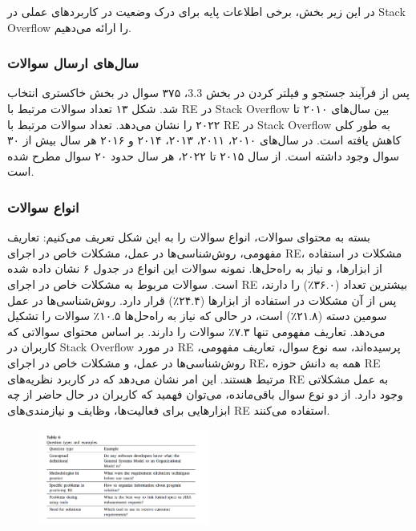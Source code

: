 \documentclass[a4paper,10pt]{article}
\begin{document}
            در این زیر بخش، برخی اطلاعات پایه برای درک وضعیت در کاربردهای عملی در Stack Overflow را ارائه می‌دهیم.

            \subsubsection{سال‌های ارسال سوالات}

                پس از فرآیند جستجو و فیلتر کردن در بخش 3.3، ۳۷۵ سوال در بخش خاکستری انتخاب شد. شکل ۱۳ تعداد سوالات مرتبط با RE در Stack Overflow بین سال‌های ۲۰۱۰ تا ۲۰۲۲ را نشان می‌دهد. تعداد سوالات مرتبط با RE در Stack Overflow به طور کلی کاهش یافته است. در سال‌های ۲۰۱۰، ۲۰۱۱، ۲۰۱۳، ۲۰۱۴ و ۲۰۱۶ هر سال بیش از ۳۰ سوال وجود داشته است. از سال ۲۰۱۵ تا ۲۰۲۲، هر سال حدود ۲۰ سوال مطرح شده است.

            \subsubsection{انواع سوالات}

                بسته به محتوای سوالات، انواع سوالات را به این شکل تعریف می‌کنیم: تعاریف مفهومی، روش‌شناسی‌ها در عمل، مشکلات خاص در اجرای RE، مشکلات در استفاده از ابزارها، و نیاز به راه‌حل‌ها. نمونه سوالات این انواع در جدول ۶ نشان داده شده است. سوالات مربوط به مشکلات خاص در اجرای RE بیشترین تعداد (۳۶.۰٪) را دارند، پس از آن مشکلات در استفاده از ابزارها (۲۴.۴٪) قرار دارد. روش‌شناسی‌ها در عمل سومین دسته (۲۱.۸٪) است، در حالی که نیاز به راه‌حل‌ها ۱۰.۵٪ سوالات را تشکیل می‌دهد. تعاریف مفهومی تنها ۷.۳٪ سوالات را دارند. بر اساس محتوای سوالاتی که کاربران در Stack Overflow در مورد RE پرسیده‌اند، سه نوع سوال، تعاریف مفهومی، روش‌شناسی‌ها در عمل، و مشکلات خاص در اجرای RE، همه به دانش حوزه RE مرتبط هستند. این امر نشان می‌دهد که در کاربرد نظریه‌های RE به عمل مشکلاتی وجود دارد. از دو نوع سوال باقی‌مانده، می‌توان فهمید که کاربران در حال حاضر از چه ابزارهایی برای فعالیت‌ها، وظایف و نیازمندی‌های RE استفاده می‌کنند.

                \begin{figure}
                    \centering
                    \includegraphics[width=0.5\textwidth]{Image/table-6.png}
                \end{figure}
\end{document}
